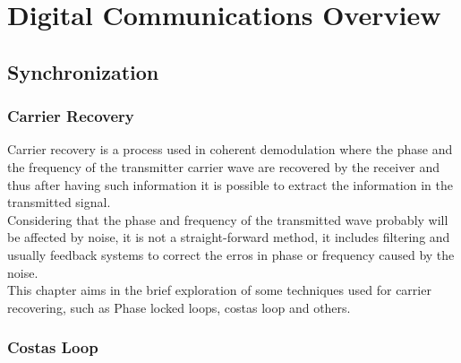 \chapter{Digital Communications Overview}
\label{cap:digitalcomm}

\section{Synchronization}

\subsection{Carrier Recovery}

Carrier recovery is a process used in coherent demodulation where the phase
and the frequency of the transmitter carrier wave are recovered by the receiver
and thus after having such information it is possible to extract the information
in the transmitted signal.\\
Considering that the phase and frequency of the transmitted wave probably will
be affected by noise, it is not a straight-forward method, it includes filtering
and usually feedback systems to correct the erros in phase or frequency caused
by the noise.\\
This chapter aims in the brief exploration of some techniques used for carrier
recovering, such as Phase locked loops, costas loop and others.\\

\subsection{Costas Loop}
